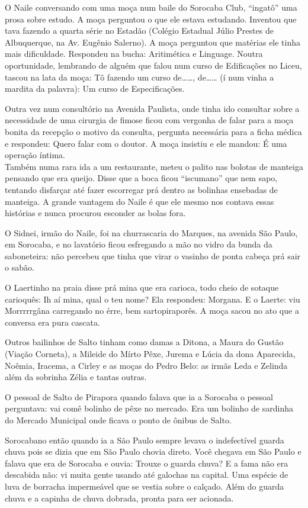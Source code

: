 \documentclass[12pt,brazil,]{book}
\begin{document}
O Naile conversando com uma moça num baile do Sorocaba Club, ``ingatô''
uma prosa sobre estudo. A moça perguntou o que ele estava estudando.
Inventou que tava fazendo a quarta série no Estadão (Colégio Estadual
Júlio Prestes de Albuquerque, na Av. Eugênio Salerno). A moça perguntou
que matérias ele tinha mais dificuldade. Respondeu na bucha: Aritimética
e Linguage. Noutra oportunidade, lembrando de alguém que falou num curso
de Edificações no Liceu, tascou na lata da moça: Tô fazendo um curso
de\ldots{}\ldots{}, de\ldots{}\ldots{} (í num vinha a mardita da
palavra): Um curso de Especificações.

Outra vez num consultório na Avenida Paulista, onde tinha ido consultar
sobre a necessidade de uma cirurgia de fimose ficou com vergonha de
falar para a moça bonita da recepção o motivo da consulta, pergunta
necessária para a ficha médica e respondeu: Quero falar com o doutor. A
moça insistiu e ele mandou: É uma operação íntima.\\
Também numa rara ida a um restaurante, meteu o palito nas bolotas de
manteiga pensando que era queijo. Disse que a boca ficou ``iscumano''
que nem sapo, tentando disfarçar até fazer escorregar prá dentro as
bolinhas ensebadas de manteiga. A grande vantagem do Naile é que ele
mesmo nos contava essas histórias e nunca procurou esconder as bolas
fora.

O Sidnei, irmão do Naile, foi na churrascaria do Marques, na avenida São
Paulo, em Sorocaba, e no lavatório ficou esfregando a mão no vidro da
bunda da saboneteira: não percebeu que tinha que virar o vasinho de
ponta cabeça prá sair o sabão.

O Laertinho na praia disse prá mina que era carioca, todo cheio de
sotaque carioquês: Ih aí mina, qual o teu nome? Ela respondeu: Morgana.
E o Laerte: viu Morrrrrgâna carregando no érre, bem sartopiraporês. A
moça sacou no ato que a conversa era pura cascata.

Outros bailinhos de Salto tinham como damas a Ditona, a Maura do Gustão
(Viação Corneta), a Mileide do Mírto Pêxe, Jurema e Lúcia da dona
Aparecida, Noêmia, Iracema, a Cirley e as moças do Pedro Belo: as irmãs
Leda e Zelinda além da sobrinha Zélia e tantas outras.

O pessoal de Salto de Pirapora quando falava que ia a Sorocaba o pessoal
perguntava: vai comê bolinho de pêxe no mercado. Era um bolinho de
sardinha do Mercado Municipal onde ficava o ponto de ônibus de Salto.

Sorocabano então quando ia a São Paulo sempre levava o indefectível
guarda chuva pois se dizia que em São Paulo chovia direto. Você chegava
em São Paulo e falava que era de Sorocaba e ouvia: Trouxe o guarda
chuva? E a fama não era descabida não: vi muita gente usando até
galochas na capital. Uma espécie de luva de borracha impermeável que se
vestia sobre o calçado. Além do guarda chuva e a capinha de chuva
dobrada, pronta para ser acionada.
\end{document}
